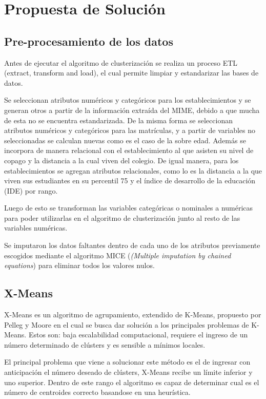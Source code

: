 \chapter{Propuesta de Solución}

\section{Pre-procesamiento de los datos}

Antes de ejecutar el algoritmo de clusterización se realiza un proceso ETL (extract, transform and load), el cual permite limpiar y estandarizar las bases de datos.

Se seleccionan atributos numéricos y categóricos para los establecimientos y se generan otros a partir de la información extraída del MIME, debido a que mucha de esta no se encuentra estandarizada. De la misma forma se seleccionan atributos numéricos y categóricos para las matrículas, y a partir de variables no seleccionadas se calculan nuevas como es el caso de la sobre edad. Además se incorpora de manera relacional con el establecimiento al que asisten su nivel de copago y la distancia a la cual viven del colegio. De igual manera, para los establecimientos se agregan atributos relacionales, como lo es la distancia a la que viven sus estudiantes en su percentil 75 y el índice de desarrollo de la educación (IDE) por rango.

Luego de esto se transforman las variables categóricas o nominales a numéricas para poder utilizarlas en el algoritmo de clusterización junto al resto de las variables numéricas.

Se imputaron los datos faltantes dentro de cada uno de los atributos previamente escogidos mediante el algoritmo MICE (\textit{(Multiple imputation by chained equations}) para eliminar todos los valores nulos.


\section{X-Means}

X-Means es un algoritmo de agrupamiento, extendido de K-Means, propuesto por Pelleg y Moore \cite{Pelleg00x-means:extending} en el cual se busca dar solución a los principales problemas de K-Means. Estos son: baja escalabilidad computacional, requiere el ingreso de un número determinado de clústers y es sensible a mínimos locales.

El principal problema que viene a solucionar este método es el de ingresar con anticipación el número deseado de clústers, X-Means recibe un límite inferior y uno superior. Dentro de este rango el algoritmo es capaz de determinar cual es el número de centroides correcto basandose en una heurística.

